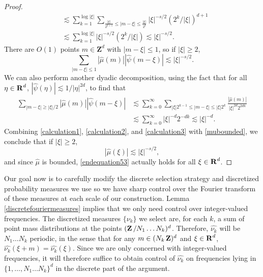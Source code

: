 \begin{proof}
\begin{equation}
\begin{split}
        &\lesssim \sum_{k = 1}^{\log |\xi|} \sum_{\frac{|\xi|}{2^{k+1}} \leq |m - \xi| \leq \frac{|\xi|}{2^{k}}} |\xi|^{-s/2} \left( 2^k/|\xi| \right)^{d+1}\\
        &\lesssim \sum_{k = 1}^{\log |\xi|} |\xi|^{-s/2} (2^k / |\xi| ) \lesssim |\xi|^{-s/2}.
    \end{split}
    \end{equation}
    There are $O(1)$ points $m \in \mathbf{Z}^d$ with $|m - \xi| \leq 1$, so if $|\xi| \geq 2$,
    \begin{equation} \label{calculation2}
        \sum_{|m - \xi| \leq 1} |\widehat{\mu}(m)| |\widehat{\psi}(m - \xi)| \lesssim |\xi|^{-s/2}.
    \end{equation}
    We can also perform another dyadic decomposition, using the fact that for all $\eta \in \operatorname{\mathbf{R}}^d$, $|\widehat{\psi}(\eta)| \lesssim 1/|\eta|^{2d}$, to find that
    \begin{equation} \label{calculation3}
    \begin{split}
        \sum_{|m - \xi| \geq |\xi|/2} |\widehat{\mu}(m)| |\widehat{\psi}(m - \xi)| &\lesssim \sum_{k = 0}^\infty \sum_{|\xi| 2^{k-1} \leq |m - \xi| \leq |\xi| 2^k} \frac{|\widehat{\mu}(m)|}{|\xi|^{2d} 2^{2dk}}\\
        &\lesssim \sum_{k = 0}^\infty |\xi|^{-d} 2^{-dk} \lesssim |\xi|^{-d}.
    \end{split}
    \end{equation}
    Combining \eqref{calculation1}, \eqref{calculation2}, and \eqref{calculation3} with \eqref{mubounded}, we conclude that if $|\xi| \geq 2$,
    \begin{equation} \label{endequation53}
        |\widehat{\mu}(\xi)| \lesssim |\xi|^{-s/2},
    \end{equation}
    and since $\widehat{\mu}$ is bounded, \eqref{endequation53} actually holds for all $\xi \in \operatorname{\mathbf{R}}^d$.
\end{proof}

Our goal now is to carefully modify the discrete selection strategy and discretized probability measures we use so we have sharp control over the Fourier transform of these measures at each scale of our construction. Lemma \ref{discretefouriermeasures} implies that we only need control over integer-valued frequencies. The discretized measures $\{ \nu_k \}$ we select are, for each $k$, a sum of point mass distributions at the points $(\operatorname{\mathbf{Z}}/N_1 \dots N_k)^d$. Therefore, $\widehat{\nu_k}$ will be $N_1 \dots N_k$ periodic, in the sense that for any $m \in (N_k \operatorname{\mathbf{Z}})^d$ and $\xi \in \operatorname{\mathbf{R}}^d$, $\widehat{\nu_k}(\xi + m) = \widehat{\nu_k}(\xi)$. Since we are only concerned with integer-valued frequencies, it will therefore suffice to obtain control of $\widehat{\nu_k}$ on frequencies lying in $\{ 1, \dots, N_1 \dots N_k \}^d$ in the discrete part of the argument.

